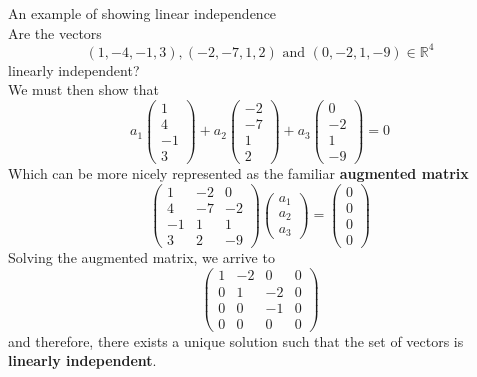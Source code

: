 \documentclass[journal, letterpaper]{IEEEtran}
\begin{document}
    \begin{myboxg}{An example of showing linear independence} \\ 
        Are the vectors 
        $$ (1, -4, -1, 3), (-2, -7, 1, 2) \text{ and } (0, -2, 1, -9) \in \mathbb{R}^4$$
        linearly independent?
        \newline \\ 
        We must then show that 
        $$
        a_1 \begin{pmatrix}
            1 \\ 4 \\ -1 \\ 3
        \end{pmatrix} + a_2 \begin{pmatrix}
            -2 \\ -7 \\ 1 \\ 2
        \end{pmatrix} + a_3 \begin{pmatrix}
            0 \\ -2 \\ 1 \\ -9
        \end{pmatrix} = 0
        $$
        Which can be more nicely represented as the familiar \textbf{augmented matrix}
        $$
        \begin{pmatrix}
            1 & -2 & 0 \\
            4 & -7 & -2 \\
            -1 & 1 & 1 \\ 
            3 & 2 & -9
        \end{pmatrix} \begin{pmatrix}
            a_1 \\ a_2 \\ a_3
        \end{pmatrix} = \begin{pmatrix}
            0 \\ 0 \\ 0 \\ 0
        \end{pmatrix}
        $$
        Solving the augmented matrix, we arrive to
        $$
        \begin{pmatrix}
            1 & -2 & 0 & 0 \\
            0 & 1 & -2 & 0 \\ 
            0 & 0 & -1 & 0 \\
            0 & 0 & 0 & 0
        \end{pmatrix}
        $$
        and therefore, there exists a unique solution such that the set of vectors is \textbf{linearly independent}.
    \end{myboxg}
\end{document}
